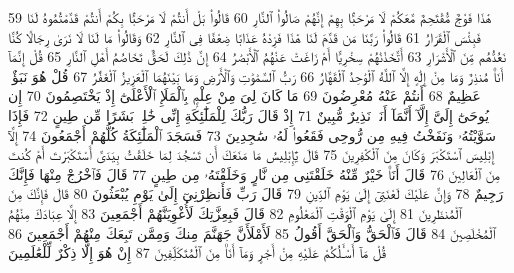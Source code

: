 {\tiny\colorbox{cl_aya}{59}} هَٰذَا فَوْجٌ مُّقْتَحِمٌ مَّعَكُمْ لَا مَرْحَبًۢا بِهِمْ إِنَّهُمْ صَالُوا۟ ٱلنَّارِ
{\tiny\colorbox{cl_aya}{60}} قَالُوا۟ بَلْ أَنتُمْ لَا مَرْحَبًۢا بِكُمْ أَنتُمْ قَدَّمْتُمُوهُ لَنَا فَبِئْسَ ٱلْقَرَارُ
{\tiny\colorbox{cl_aya}{61}} قَالُوا۟ رَبَّنَا مَن قَدَّمَ لَنَا هَٰذَا فَزِدْهُ عَذَابًا ضِعْفًا فِى ٱلنَّارِ
{\tiny\colorbox{cl_aya}{62}} وَقَالُوا۟ مَا لَنَا لَا نَرَىٰ رِجَالًا كُنَّا نَعُدُّهُم مِّنَ ٱلْأَشْرَارِ
{\tiny\colorbox{cl_aya}{63}} أَتَّخَذْنَٰهُمْ سِخْرِيًّا أَمْ زَاغَتْ عَنْهُمُ ٱلْأَبْصَٰرُ
{\tiny\colorbox{cl_aya}{64}} إِنَّ ذَٰلِكَ لَحَقٌّ تَخَاصُمُ أَهْلِ ٱلنَّارِ
{\tiny\colorbox{cl_aya}{65}} قُلْ إِنَّمَآ أَنَا۠ مُنذِرٌ وَمَا مِنْ إِلَٰهٍ إِلَّا ٱللَّهُ ٱلْوَٰحِدُ ٱلْقَهَّارُ
{\tiny\colorbox{cl_aya}{66}} رَبُّ ٱلسَّمَٰوَٰتِ وَٱلْأَرْضِ وَمَا بَيْنَهُمَا ٱلْعَزِيزُ ٱلْغَفَّٰرُ
{\tiny\colorbox{cl_aya}{67}} قُلْ هُوَ نَبَؤٌا۟ عَظِيمٌ
{\tiny\colorbox{cl_aya}{68}} أَنتُمْ عَنْهُ مُعْرِضُونَ
{\tiny\colorbox{cl_aya}{69}} مَا كَانَ لِىَ مِنْ عِلْمٍۭ بِٱلْمَلَإِ ٱلْأَعْلَىٰٓ إِذْ يَخْتَصِمُونَ
{\tiny\colorbox{cl_aya}{70}} إِن يُوحَىٰٓ إِلَىَّ إِلَّآ أَنَّمَآ أَنَا۠ نَذِيرٌ مُّبِينٌ
{\tiny\colorbox{cl_aya}{71}} إِذْ قَالَ رَبُّكَ لِلْمَلَٰٓئِكَةِ إِنِّى خَٰلِقٌۢ بَشَرًا مِّن طِينٍ
{\tiny\colorbox{cl_aya}{72}} فَإِذَا سَوَّيْتُهُۥ وَنَفَخْتُ فِيهِ مِن رُّوحِى فَقَعُوا۟ لَهُۥ سَٰجِدِينَ
{\tiny\colorbox{cl_aya}{73}} فَسَجَدَ ٱلْمَلَٰٓئِكَةُ كُلُّهُمْ أَجْمَعُونَ
{\tiny\colorbox{cl_aya}{74}} إِلَّآ إِبْلِيسَ ٱسْتَكْبَرَ وَكَانَ مِنَ ٱلْكَٰفِرِينَ
{\tiny\colorbox{cl_aya}{75}} قَالَ يَٰٓإِبْلِيسُ مَا مَنَعَكَ أَن تَسْجُدَ لِمَا خَلَقْتُ بِيَدَىَّ أَسْتَكْبَرْتَ أَمْ كُنتَ مِنَ ٱلْعَالِينَ
{\tiny\colorbox{cl_aya}{76}} قَالَ أَنَا۠ خَيْرٌ مِّنْهُ خَلَقْتَنِى مِن نَّارٍ وَخَلَقْتَهُۥ مِن طِينٍ
{\tiny\colorbox{cl_aya}{77}} قَالَ فَٱخْرُجْ مِنْهَا فَإِنَّكَ رَجِيمٌ
{\tiny\colorbox{cl_aya}{78}} وَإِنَّ عَلَيْكَ لَعْنَتِىٓ إِلَىٰ يَوْمِ ٱلدِّينِ
{\tiny\colorbox{cl_aya}{79}} قَالَ رَبِّ فَأَنظِرْنِىٓ إِلَىٰ يَوْمِ يُبْعَثُونَ
{\tiny\colorbox{cl_aya}{80}} قَالَ فَإِنَّكَ مِنَ ٱلْمُنظَرِينَ
{\tiny\colorbox{cl_aya}{81}} إِلَىٰ يَوْمِ ٱلْوَقْتِ ٱلْمَعْلُومِ
{\tiny\colorbox{cl_aya}{82}} قَالَ فَبِعِزَّتِكَ لَأُغْوِيَنَّهُمْ أَجْمَعِينَ
{\tiny\colorbox{cl_aya}{83}} إِلَّا عِبَادَكَ مِنْهُمُ ٱلْمُخْلَصِينَ
{\tiny\colorbox{cl_aya}{84}} قَالَ فَٱلْحَقُّ وَٱلْحَقَّ أَقُولُ
{\tiny\colorbox{cl_aya}{85}} لَأَمْلَأَنَّ جَهَنَّمَ مِنكَ وَمِمَّن تَبِعَكَ مِنْهُمْ أَجْمَعِينَ
{\tiny\colorbox{cl_aya}{86}} قُلْ مَآ أَسْـَٔلُكُمْ عَلَيْهِ مِنْ أَجْرٍ وَمَآ أَنَا۠ مِنَ ٱلْمُتَكَلِّفِينَ
{\tiny\colorbox{cl_aya}{87}} إِنْ هُوَ إِلَّا ذِكْرٌ لِّلْعَٰلَمِينَ
